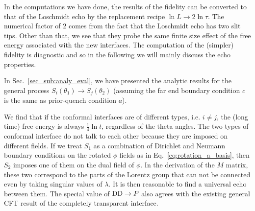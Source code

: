 

In the computations we have done, the results of the fidelity can be converted to that of the Loschmidt echo by the replacement recipe $ \ln L \rightarrow 2 \ln \tau$. The numerical factor of $2$ comes from the fact that the Loschmidt echo has two slit tips. Other than that, we see that they probe the same finite size effect of the free energy associated with the new interfaces. The computation of the (simpler) fidelity is diagnostic and so in the following we will mainly discuss the echo properties. 

In Sec.~\ref{sec_sub:analy_eval}, we have presented the analytic results for the general process $S_i( \theta_1 ) \rightarrow S_j( \theta_2 )$ {\iffalse {\color{red}described in Eq.~\eqref{eq:S_i_S_j}}\fi} (assuming the far end boundary condition $c$ is the same as prior-quench condition $a$). 

We find that if the conformal interfaces are of different types, i.e. $i \ne j$, the (long time) free energy is always $\frac{1}{4} \ln t$, regardless of the theta angles. The two types of conformal interface do not talk to each other because they are imposed on different fields. If we treat $S_1$ as a combination of Dirichlet and Neumann boundary conditions on the rotated $\phi$ fields as in Eq.~\eqref{eq:rotation_a_basis}, then $S_2$ imposes one of them on the dual field of $\phi$. In the derivation of the $M$ matrix, these two correspond to the parts of the Lorentz group that can not be connected even by taking singular values of $\lambda$. It is then reasonable to find a universal echo between them. The special value of ${\rm DD} \rightarrow P$ also agrees with the existing general CFT result of the completely transparent interface\cite{stephan_logarithmic_2013,stephan_local_2011,vasseur_universal_2014,vasseur_crossover_2013,kennes_universal_2014}. 


